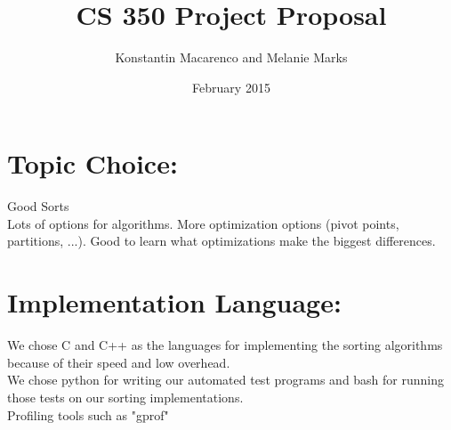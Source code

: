 \documentclass{article}
\title{CS 350 Project Proposal}
\author{Konstantin Macarenco and Melanie Marks }
\date{February 2015}
\begin{document}
\maketitle


%


\noindent
\section*{Topic Choice:}
Good Sorts\\
Lots of options for algorithms.  More optimization options (pivot points, partitions, ...).  Good to learn what optimizations make the biggest differences.\\
\section*{Implementation Language:}
We chose C and C++ as the languages for implementing the sorting algorithms because of their speed and low overhead.\\
We chose python for writing our automated test programs and bash for running those tests on our sorting implementations.\\
Profiling tools such as "gprof"\\
\end{document}
